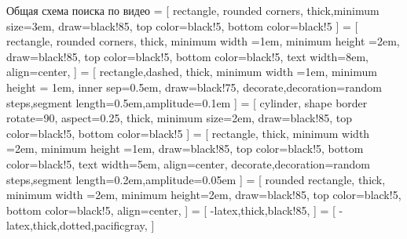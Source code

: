 

\begin{frame}{Общая схема поиска по видео}
    \sf\scriptsize
     = [
        rectangle, rounded corners,
        thick,minimum size=3em,
        draw=black!85,
        top color=black!5,
        bottom color=black!5
    ]
     = [
        rectangle, rounded corners,
        thick,
        minimum width =1em,
        minimum height =2em,
        draw=black!85,
        top color=black!5,
        bottom color=black!5,
        text width=8em,
        align=center,
    ]
     = [
        rectangle,dashed,
        thick,
        minimum width =1em,
        minimum height = 1em,
        inner sep=0.5em,
        draw=black!75,
        decorate,decoration={random steps,segment length=0.5em,amplitude=0.1em}
    ]
     = [
        cylinder,  shape border rotate=90,
        aspect=0.25,
        thick,
        minimum size=2em,
        draw=black!85,
        top color=black!5,
        bottom color=black!5
    ]
     = [
        rectangle,
        thick,
        minimum width =2em,
        minimum height =1em,
        draw=black!85,
        top color=black!5,
        bottom color=black!5,
        text width=5em,
        align=center,
        decorate,decoration={random steps,segment length=0.2em,amplitude=0.05em}
    ]
     = [
        rounded  rectangle,
        thick,
        minimum width =2em,
        minimum height=2em,
        draw=black!85,
        top color=black!5,
        bottom color=black!5,
        align=center,
    ]
     = [
        -latex,thick,black!85,
    ]
     = [
        -latex,thick,dotted,pacificgray,
    ]
    \begin{center}
\end{center}
\end{frame}
